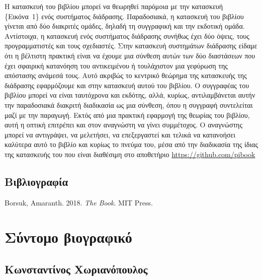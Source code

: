 \documentclass[
]{article}
\newlength{\cslhangindent}
\newlength{\cslentryspacingunit} %
\newenvironment{CSLReferences}[2] %
 {%
  \setlength{\parindent}{0pt}
  \ifodd #1
  \let\oldpar\par
  \def\par{\hangindent=\cslhangindent\oldpar}
  \fi
  \setlength{\parskip}{#2\cslentryspacingunit}
 }%
 {}
\begin{document}
Η κατασκευή του βιβλίου μπορεί να θεωρηθεί παρόμοια με την κατασκευή
\{Εικόνα~1\} ενός συστήματος διάδρασης. Παραδοσιακά, η κατασκευή του
βιβλίου γίνεται από δύο διακριτές ομάδες, δηλαδή τη συγγραφική και την
εκδοτική ομάδα. Αντίστοιχα, η κατασκευή ενός συστήματος διάδρασης
συνήθως έχει δύο όψεις, τους προγραμματιστές και τους σχεδιαστές. Στην
κατασκευή συστημάτων διάδρασης είδαμε ότι η βέλτιστη πρακτική είναι να
έχουμε μια σύνθεση αυτών των δύο διαστάσεων που έχει σφαιρική κατανόηση
του αντικειμένου ή τουλάχιστον μια γεφύρωση της απόστασης ανάμεσά τους.
Αυτό ακριβώς το κεντρικό θεώρημα της κατασκευής της διάδρασης
εφαρμόζουμε και στην κατασκευή αυτού του βιβλίου. Ο συγγραφέας του
βιβλίου μπορεί να είναι ταυτόχρονα και εκδότης, αλλά, κυρίως,
αντιλαμβάνεται αυτήν την παραδοσιακά διακριτή διαδικασία ως μια σύνθεση,
όπου η συγγραφή συντελείται μαζί με την παραγωγή. Εκτός από μια πρακτική
εφαρμογή της θεωρίας του βιβλίου, αυτή η οπτική επιτρέπει και στον
αναγνώστη να γίνει συμμέτοχος. Ο αναγνώστης μπορεί να αντιγράψει, να
μελετήσει, να επεξεργαστεί και τελικά να κατανοήσει καλύτερα αυτό το
βιβλίο και κυρίως το πνεύμα του, μέσα από την διαδικασία της ίδιας της
κατασκευής του που είναι διαθέσιμη στο αποθετήριο
\url{https://github.com/pibook}

\hypertarget{ux3b2ux3b9ux3b2ux3bbux3b9ux3bfux3b3ux3c1ux3b1ux3c6ux3afux3b1}{%
\subsection*{Βιβλιογραφία}\label{ux3b2ux3b9ux3b2ux3bbux3b9ux3bfux3b3ux3c1ux3b1ux3c6ux3afux3b1}}

\hypertarget{refs}{}
\begin{CSLReferences}{0}{0}
\end{CSLReferences}

Borsuk, Amaranth. 2018. \emph{The Book}. MIT Press.

\hypertarget{ux3c3ux3cdux3bdux3c4ux3bfux3bcux3bf-ux3b2ux3b9ux3bfux3b3ux3c1ux3b1ux3c6ux3b9ux3baux3cc}{%
\section{Σύντομο
βιογραφικό}\label{ux3c3ux3cdux3bdux3c4ux3bfux3bcux3bf-ux3b2ux3b9ux3bfux3b3ux3c1ux3b1ux3c6ux3b9ux3baux3cc}}

\hypertarget{ux3baux3c9ux3bdux3c3ux3c4ux3b1ux3bdux3c4ux3afux3bdux3bfux3c2-ux3c7ux3c9ux3c1ux3b9ux3b1ux3bdux3ccux3c0ux3bfux3c5ux3bbux3bfux3c2}{%
\subsection{Κωνσταντίνος
Χωριανόπουλος}\label{ux3baux3c9ux3bdux3c3ux3c4ux3b1ux3bdux3c4ux3afux3bdux3bfux3c2-ux3c7ux3c9ux3c1ux3b9ux3b1ux3bdux3ccux3c0ux3bfux3c5ux3bbux3bfux3c2}}
\end{document}
